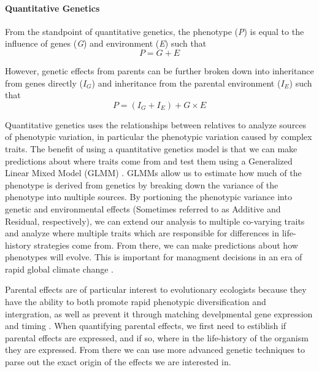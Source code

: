 \documentclass[12pt]{extarticle}
\begin{document}
\paragraph{Quantitative Genetics}
From the standpoint of quantitative genetics, the phenotype (\textit{P}) is equal to the influence of genes (\textit{G}) and environment (\textit{E}) such that $$P = G + E $$

However, genetic effects from parents can be further broken down into inheritance from genes directly ($I_G$) and inheritance from the parental environment ($I_E$) such that $$P = (I_G + I_E) + G \times E$$

Quantitative genetics uses the relationships between relatives to analyze sources of phenotypic variation, in particular the phenotypic variation caused by complex traits.
The benefit of using a quantitative genetics model is that we can make predictions about where traits come from and test them using a Generalized Linear Mixed Model (GLMM) \citep{Wilson2010, Bolker2009, VanDooren2016}. GLMMs allow us to estimate how much of the phenotype is derived from genetics by breaking down the variance of the phenotype into multiple sources. By portioning the phenotypic variance into genetic and environmental effects (Sometimes referred to as Additive and Residual, respectively), we can extend our analysis to multiple co-varying traits and analyze where multiple traits which are responsible for differences in life-history strategies come from. From there, we can make predictions about how phenotypes will evolve. This is important for managment decisions in an era of rapid global climate change \citep{VanDooren2016}.

Parental effects are of particular interest to evolutionary ecologists because they have the ability to both promote rapid phenotypic diversification and intergration, as well as prevent it through matching develpmental gene expression and timing \citep{Badyaev2009}. When quantifying parental effects, we first need to estiblish if parental effects are expressed, and if so, where in the life-history of the organism they are expressed. From there we can use more advanced genetic techniques to parse out the exact origin of the effects we are interested in.
\end{document}
